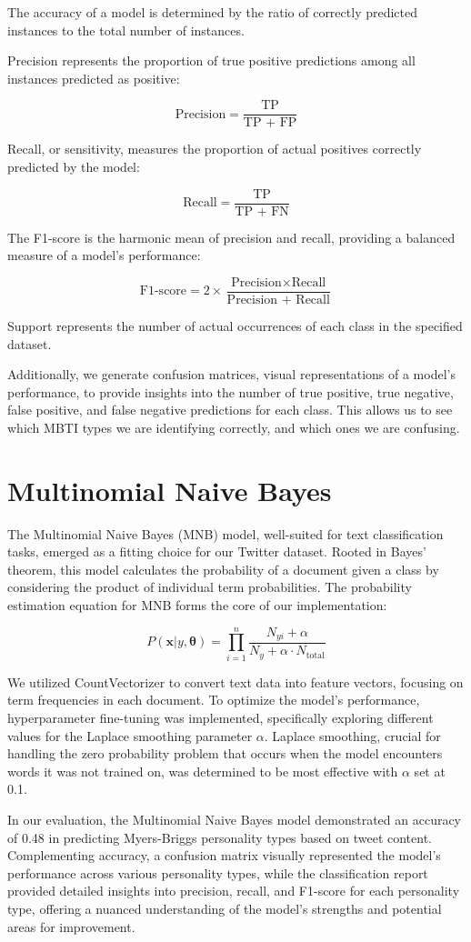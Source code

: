 \documentclass[twoside,11pt]{article}
\begin{document}
The accuracy of a model is determined by the ratio of correctly predicted instances to the total number of instances.

Precision represents the proportion of true positive predictions among all instances predicted as positive:

\[
\text{Precision} = \frac{\text{TP}}{\text{TP + FP}}
\]

Recall, or sensitivity, measures the proportion of actual positives correctly predicted by the model:

\[
\text{Recall} = \frac{\text{TP}}{\text{TP + FN}}
\]

The F1-score is the harmonic mean of precision and recall, providing a balanced measure of a model's performance:

\[
\text{F1-score} = 2 \times \frac{\text{Precision} \times \text{Recall}}{\text{Precision + Recall}}
\]

Support represents the number of actual occurrences of each class in the specified dataset.

Additionally, we generate confusion matrices, visual representations of a model's performance, to provide insights into the number of true positive, true negative, false positive, and false negative predictions for each class. This allows us to see which MBTI types we are identifying correctly, and which ones we are confusing.

\section{Multinomial Naive Bayes}
The Multinomial Naive Bayes (MNB) model, well-suited for text classification tasks, emerged as a fitting choice for our Twitter dataset. Rooted in Bayes' theorem, this model calculates the probability of a document given a class by considering the product of individual term probabilities. The probability estimation equation for MNB forms the core of our implementation:

\[ P(\textbf{x}|y, \boldsymbol{\theta}) = \prod_{i=1}^{n} \frac{N_{yi} + \alpha}{N_{y} + \alpha \cdot N_{\text{total}}} \]

We utilized CountVectorizer to convert text data into feature vectors, focusing on term frequencies in each document. To optimize the model's performance, hyperparameter fine-tuning was implemented, specifically exploring different values for the Laplace smoothing parameter \(\alpha\). Laplace smoothing, crucial for handling the zero probability problem that occurs when the model encounters words it was not trained on, was determined to be most effective with \(\alpha\) set at 0.1.

In our evaluation, the Multinomial Naive Bayes model demonstrated an accuracy of 0.48 in predicting Myers-Briggs personality types based on tweet content. Complementing accuracy, a confusion matrix visually represented the model's performance across various personality types, while the classification report provided detailed insights into precision, recall, and F1-score for each personality type, offering a nuanced understanding of the model's strengths and potential areas for improvement.

\vskip 0.2in
\end{document}
